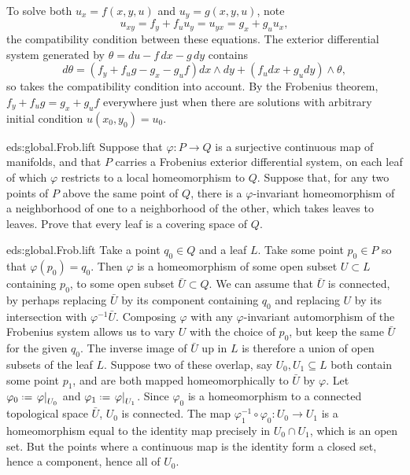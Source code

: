 \begin{example}
To solve both \(u_x=f(x,y,u)\) and \(u_y=g(x,y,u)\), note
\[
u_{xy}=f_y+f_uu_y=u_{yx}=g_x+g_uu_x,
\]
the compatibility condition between these equations.
The exterior differential system generated by \(\theta=du-f\,dx-g\,dy\) contains 
\[
d\theta=(f_y+f_ug-g_x-g_uf)dx\wedge dy+(f_udx+g_udy)\wedge\theta,
\]
so takes the compatibility condition into account.
By the Frobenius theorem, \(f_y+f_ug=g_x+g_uf\) everywhere just when there are solutions with arbitrary initial condition \(u(x_0,y_0)=u_0\).
\end{example}
\begin{problem}{eds:global.Frob.lift}
Suppose that \(\varphi \colon P \to Q\) is a surjective continuous map of manifolds, and that \(P\) carries a Frobenius exterior differential system, on each leaf of which \(\varphi\) restricts to a local homeomorphism to \(Q\).
Suppose that, for any two points of \(P\) above the same point of \(Q\), there is a \(\varphi\)-invariant homeomorphism of a neighborhood of one to a neighborhood of the other, which takes leaves to leaves.
Prove that every leaf is a covering space of \(Q\).
\end{problem}
\begin{answer}{eds:global.Frob.lift}
Take a point \(q_0 \in Q\) and a leaf \(L\).
Take some point \(p_0 \in P\) so that \(\varphi(p_0)=q_0\).
Then \(\varphi\) is a homeomorphism of some open subset \(U\subset L\) containing \(p_0\), to some open subset \(\bar{U}\subset Q\).
We can assume that \(\bar{U}\) is connected, by perhaps replacing \(\bar{U}\) by its component containing \(q_0\) and replacing \(U\) by its intersection with \(\varphi^{-1}\bar{U}\).
Composing \(\varphi\) with any \(\varphi\)-invariant automorphism of the Frobenius system allows us to vary \(U\) with the choice of \(p_0\), but keep the same \(\bar{U}\) for the given \(q_0\).
The inverse image of \(\bar{U}\) up in \(L\) is therefore a union of open subsets of the leaf \(L\).
Suppose two of these overlap, say \(U_0,U_1\subseteq L\) both contain some point \(p_1\), and are both mapped homeomorphically to \(\bar{U}\) by \(\varphi\).
Let \(\varphi_0\defeq\left.\varphi\right|_{U_0}\) and \(\varphi_1\defeq\left.\varphi\right|_{U_1}\).
Since \(\varphi_0\) is a homeomorphism to a connected topological space \(\bar{U}\), \(U_0\) is connected. 
The map \(\varphi_1^{-1}\circ\varphi_0\colon U_0\to U_1\) is a homeomorphism equal to the identity map precisely in \(U_0\cap U_1\), which is an open set.
But the points where a continuous map is the identity form a closed set, hence a component, hence all of \(U_0\).
\end{answer}
